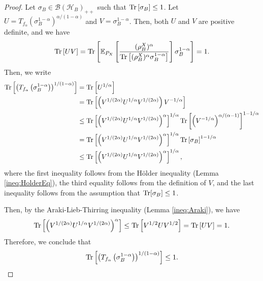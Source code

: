 \documentclass{article}
\begin{document}
\begin{proof}
Let $\sigma_B \in \mathcal{B}\left(\mathcal{H}_B\right)_{++}$ such that $\Tr\left[\sigma_B\right]\leq 1$. 
Let $U = T_{f_{\alpha}}\left(\sigma_B^{1-\alpha}\right)^{\alpha/(1-\alpha)}$ and $V = \sigma_B^{1-\alpha}$.
Then, both $U$ and $V$ are positive definite, and we have 
\begin{align}
    \Tr \left[ UV \right]
    = \Tr\left[ \mathbb{E}_{P_X}\left[\frac{ (\rho_B^X)^\alpha}{ \Tr\left[ (\rho_B^X)^\alpha \sigma_B^{1-\alpha} \right] }\right] \sigma_B^{1-\alpha} \right]
    =1.\nonumber
\end{align}
Then, we write 
    \begin{align}
        \Tr\left[\left(T_{f_{\alpha}}\left(\sigma_B^{1-\alpha}\right)\right)^{1/(1-\alpha)}\right]
        &= \Tr\left[ U^{ 1/\alpha }\right]\\
        &= \Tr\left[ \left( V^{ 1/(2\alpha)} U^{ 1/\alpha } V^{ 1/(2\alpha) }\right) V^{ - 1/\alpha } \right]\\
        &\leq\Tr\left[ \left( V^{ 1/(2\alpha) } U^{ 1/\alpha } V^{ 1/(2\alpha) }\right)^\alpha \right]^{ 1/\alpha }  \Tr\left[ \left( V^{ -1/\alpha } \right)^{\alpha/(\alpha-1)} \right]^{ 1- 1/\alpha } \\
        &=\Tr\left[ \left( V^{  1/(2\alpha) } U^{1/\alpha } V^{ 1/(2\alpha) }\right)^\alpha \right]^{ 1/\alpha }  \Tr\left[ \sigma_B \right]^{ 1- 1/\alpha }\\
        &\leq \Tr\left[ \left( V^{ 1/(2\alpha)} U^{ 1/\alpha } V^{ 1/(2\alpha) }\right)^\alpha \right]^{ 1/\alpha },
    \end{align}
    where the first inequality follows from the H\"older inequality (Lemma \ref{ineq:HolderEq}), 
    the third equality follows from the definition of $V$,
    and the last inequality follows from the assumption that $\Tr[\sigma_B] \leq 1$.

    Then, by the Araki-Lieb-Thirring inequality (Lemma \ref{ineq:Araki}), we have 
    \begin{align}
        \Tr\left[ \left( V^{ 1/(2\alpha) } U^{ 1/\alpha } V^{ 1/(2\alpha) }\right)^\alpha \right] 
        \leq \Tr\left[ V^{1/2 } U V^{ 1/2 }\right]
        = \Tr\left[UV\right]= 1.
    \end{align} 
    Therefore, we conclude that 
    \begin{align}
        \Tr\left[\left(T_{f_{\alpha}}\left(\sigma_B^{1-\alpha}\right)\right)^{1/(1-\alpha)}\right]\leq 1.
    \end{align}
    

\end{proof}
\end{document}

